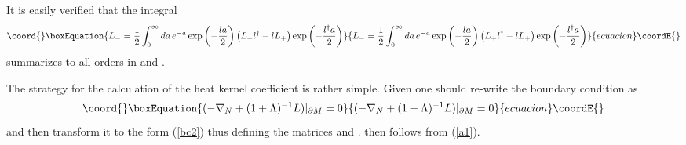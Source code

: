 \documentclass[a4paper,12pt]{article}
\begin{document}
It is easily verified that the integral
\begin{equation}\coord{}\boxEquation{
L_-=\frac 12 \int_0^\infty da\, e^{-a} \exp \left( -\frac{la}2 \right)
\left( L_+l^\dag -lL_+ \right) \exp \left( -\frac{l^\dag a}2 \right)
\label{compL-}
}{
L_-=\frac 12 \int_0^\infty da\, e^{-a} \exp \left( -\frac{la}2 \right)
\left( L_+l^\dag -lL_+ \right) \exp \left( -\frac{l^\dag a}2 \right)
}{ecuacion}\coordE{}\end{equation}
summarizes \coordHE{} to all orders in \coordHE{} and \coordHE{}.

The strategy for the calculation of the heat kernel coefficient
\coordHE{} is rather simple. Given \coordHE{} one should re-write
the boundary condition as
\begin{equation}\coord{}\boxEquation{
(-\nabla_N +(1+\Lambda )^{-1} L )\vert_{\partial M}  =0 \label{bcLam}
}{
(-\nabla_N +(1+\Lambda )^{-1} L )\vert_{\partial M}  =0 }{ecuacion}\coordE{}\end{equation}
and then transform it to the form (\ref{bc2}) thus defining the matrices 
\myHighlight{$\Gamma$}\coordHE{} and \coordHE{}. \coordHE{} then follows from (\ref{a1}). 
\end{document}
